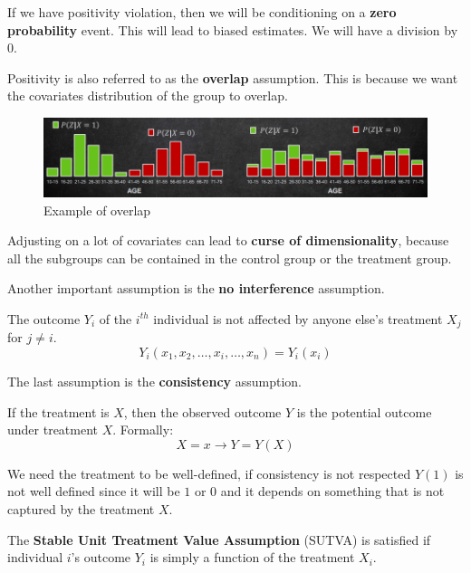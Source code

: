 If we have positivity violation, then we will be conditioning on a \textbf{zero probability}
event. This will lead to biased estimates. We will have a division by $0$.

Positivity is also referred to as the \textbf{overlap} assumption. This is because
we want the covariates distribution of the group to overlap.

\begin{figure}[!ht]
    \centering
    \includegraphics[width=\textwidth]{img/potential_outcomes/overlap.png}
    \caption{Example of overlap}
    \label{fig:positivity}
\end{figure}

Adjusting on a lot of covariates can lead to \textbf{curse of dimensionality}, because
all the subgroups can be contained in the control group or the treatment group.

Another important assumption is the \textbf{no interference} assumption.
\begin{definition}
    The outcome $Y_i$ of the $i^{th}$ individual is not affected by anyone else's
    treatment $X_j$ for $j \neq i$.
    \begin{equation}
        Y_i(x_1, x_2, \ldots, x_i, \ldots, x_n) = Y_i(x_i)
    \end{equation}
\end{definition}

The last assumption is the \textbf{consistency} assumption.
\begin{definition}
    If the treatment is $X$, then the observed outcome $Y$ is the potential outcome
    under treatment $X$. Formally:
    \begin{equation}
        X = x \rightarrow Y = Y(X)
    \end{equation}
\end{definition}

We need the treatment to be well-defined, if consistency is not respected $Y(1)$
is not well defined since it will be $1$ or $0$ and it depends on something that
is not captured by the treatment $X$.

\begin{definition}
    The \textbf{Stable Unit Treatment Value Assumption} (SUTVA) is satisfied if
    individual $i$'s outcome $Y_i$ is simply a function of the treatment $X_i$.
\end{definition}

